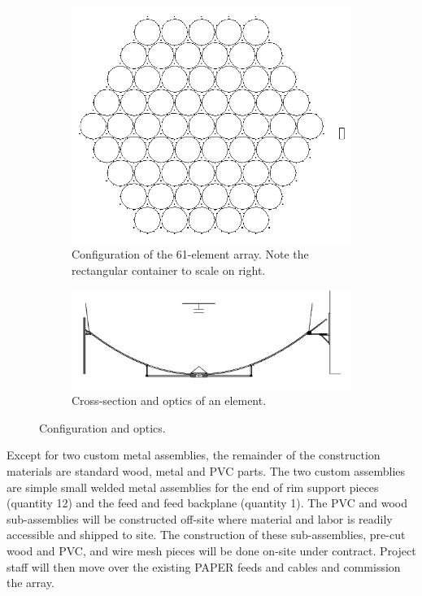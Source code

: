 \documentclass[preprint]{aastex}
\begin{document}
\begin{figure}[h]
	\centering
	\begin{subfigure}[b]{0.35\textwidth}
		\includegraphics[width=\textwidth]{plots/hex_61.png}
		\caption{Configuration of the 61-element array.  Note the rectangular container to scale on right.}
		\label{fig:config}
	\end{subfigure}
	\quad
	\begin{subfigure}[b]{0.6\textwidth}
		\includegraphics[width=\textwidth]{plots/optics.png}
		\caption{Cross-section and optics of an element.}
		\label{fig:optics}
	\end{subfigure}
	\caption{Configuration and optics.}
	\label{fig:config_optics}
\end{figure}

Except for two custom metal assemblies, the remainder of the construction materials are standard wood, 
metal and PVC parts.  The two custom assemblies are simple small welded metal assemblies for the end of 
rim support pieces (quantity 12) and the feed and feed backplane (quantity 1).  The PVC and wood sub-assemblies 
will be constructed off-site where material and labor is readily accessible and shipped to site.  The 
construction of these sub-assemblies, pre-cut wood and PVC, and wire mesh pieces will be done on-site under 
contract.  Project staff will then move over the existing PAPER feeds and cables and commission the array.  
\end{document}
